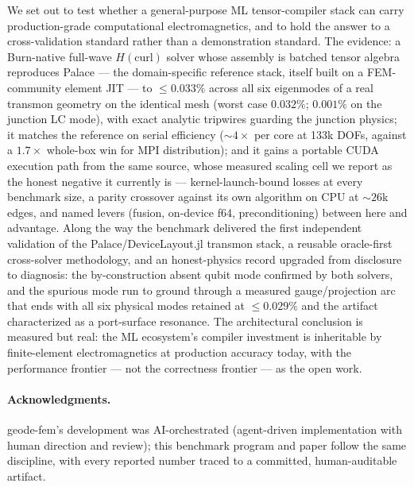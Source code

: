\documentclass{anvil-paper}
\begin{document}
We set out to test whether a general-purpose ML tensor-compiler stack can
carry production-grade computational electromagnetics, and to hold the
answer to a cross-validation standard rather than a demonstration
standard. The evidence: a Burn-native full-wave $H(\mathrm{curl})$ solver
whose assembly is batched tensor algebra reproduces Palace --- the
domain-specific reference stack, itself built on a FEM-community element
JIT --- to $\leq 0.033\%$ across all six eigenmodes of a real transmon
geometry on the identical mesh (worst case $0.032\%$; $0.001\%$ on the
junction LC mode), with exact analytic tripwires guarding the junction
physics; it matches the reference on serial efficiency (${\sim}4\times$
per core at 133k DOFs, against a $1.7\times$ whole-box win for MPI
distribution); and it gains a portable CUDA execution path from the same
source, whose measured scaling cell we report as the honest negative it
currently is --- kernel-launch-bound losses at every benchmark size, a
parity crossover against its own algorithm on CPU at ${\sim}26$k edges,
and named levers (fusion, on-device f64, preconditioning) between here
and advantage. Along the way the benchmark delivered the first
independent validation of the Palace/DeviceLayout.jl transmon stack, a
reusable oracle-first cross-solver methodology, and an honest-physics
record upgraded from disclosure to diagnosis: the by-construction absent
qubit mode confirmed by both solvers, and the spurious mode run to ground
through a measured gauge/projection arc that ends with all six physical
modes retained at $\leq 0.029\%$ and the artifact characterized as a
port-surface resonance. The architectural conclusion is measured but
real: the ML ecosystem's compiler investment is inheritable by
finite-element electromagnetics at production accuracy today, with the
performance frontier --- not the correctness frontier --- as the open
work.

\paragraph{Acknowledgments.}
geode-fem's development was AI-orchestrated (agent-driven implementation
with human direction and review); this benchmark program and paper follow
the same discipline, with every reported number traced to a committed,
human-auditable artifact.



\end{document}
